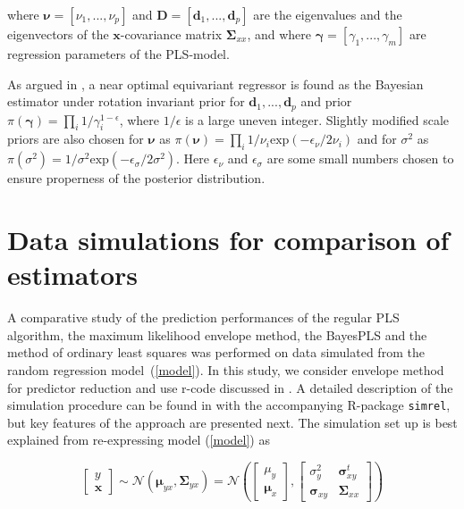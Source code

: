 \documentclass[a4paper, 11pt]{article}
\begin{document}
where $\bm{\nu}=[\nu_1,...,\nu_p]$ and $\bm{D}=[\bm{d}_1,...,\bm{d}_p]$ are the eigenvalues and the eigenvectors of the $\bm{x}$-covariance matrix $\bm{\Sigma}_{xx}$, and where $\bm{\gamma}=[\gamma_1,...,\gamma_m]$ are regression parameters of the PLS-model.

As argued in \citet{helland2012near}, a near optimal equivariant regressor is
found as the Bayesian estimator under rotation invariant prior for
$\bm{d}_1,...,\bm{d}_p$ and prior $\pi(\bm{\gamma})=\prod_i
1/\gamma_i^{1-\epsilon}$, where $1/\epsilon$ is a large uneven integer. Slightly
modified scale priors are also chosen for $\bm{\nu}$ as $\pi(\bm{\nu}) =\prod_i
1/\nu_i \mathrm{exp}(-\epsilon_\nu/2\nu_i)$ and for $\sigma^2$ as$ \pi(\sigma^2)=1/\sigma^2\mathrm{exp}(-\epsilon_\sigma/2\sigma^2)$. Here $\epsilon_\nu$ and $\epsilon_\sigma$ are some small numbers chosen to ensure properness of the posterior distribution.


\section{Data simulations for comparison of estimators}
\label{sec:data-simulation}

A comparative study of the prediction performances of the regular PLS algorithm,
the maximum likelihood envelope method, the BayesPLS and the method of ordinary least squares was performed on data simulated from the random regression model~(\ref{model}). In this study, we consider envelope method for predictor reduction \citep{cook2013envelopes} and use r-code discussed in \citet{cook2016note}. A detailed description of the simulation procedure can be found in \citep{saebo2015simrel} with the accompanying R-package {\tt simrel}, but key features of the approach are presented next. The simulation set up is best explained from re-expressing model (\ref{model}) as

\begin{equation}
  \label{eq:rand-reg-model}
  \begin{bmatrix}
    y \\ \mathbf{x}
  \end{bmatrix} \sim
  \mathcal{N}\left( \boldsymbol{\mu}_{yx}, \boldsymbol{\Sigma}_{yx} \right) =
  \mathcal{N}\left(
    \begin{bmatrix}
      \mu_y \\ \boldsymbol{\mu}_x
    \end{bmatrix},
    \begin{bmatrix}
      \sigma_y^2               & \boldsymbol{\sigma}_{xy}^t \\
      \boldsymbol{\sigma}_{xy} & \boldsymbol{\Sigma}_{xx}
    \end{bmatrix}
  \right)
\end{equation}
\end{document}
